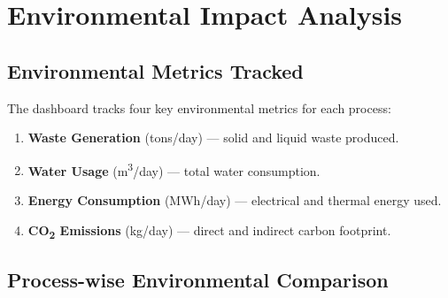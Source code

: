 \documentclass[12pt,a4paper]{report}
\begin{document}
\chapter{Environmental Impact Analysis}
\label{ch:environmental}

\section{Environmental Metrics Tracked}

The dashboard tracks four key environmental metrics for each process:

\begin{enumerate}[nosep]
  \item \textbf{Waste Generation} (tons/day) — solid and liquid waste produced.
  \item \textbf{Water Usage} (m\textsuperscript{3}/day) — total water consumption.
  \item \textbf{Energy Consumption} (MWh/day) — electrical and thermal energy used.
  \item \textbf{CO\textsubscript{2} Emissions} (kg/day) — direct and indirect carbon footprint.
\end{enumerate}

\section{Process-wise Environmental Comparison}
\end{document}
